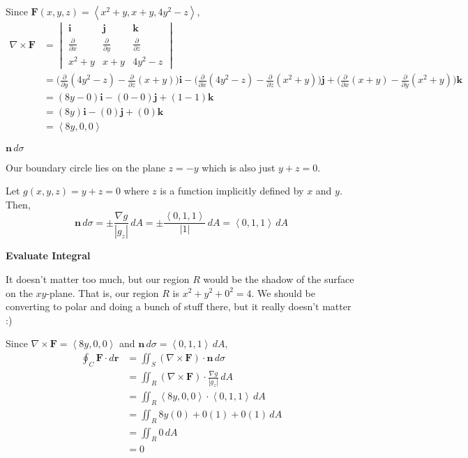 \documentclass{article}
\newcommand{\lrp}[1]{\left( #1 \right)}
\newcommand{\lra}[1]{\left\langle #1 \right\rangle}
\renewcommand{\i}[0]{\mathbf{{i}}}
\renewcommand{\j}[0]{\mathbf{{j}}}
\renewcommand{\k}[0]{\mathbf{{k}}}
\renewcommand{\r}[0]{\mathbf{r}}
\newcommand{\F}[0]{\mathbf{F}}
\newcommand{\n}[0]{{\mathbf{n}}}
\begin{document}
Since $\F(x,y,z)=\lra{x^2+y,x+y,4y^2-z}$,
\begin{align*}
     \nabla \times \F &=\begin{vmatrix}
    \i & \j & \k \\
    \frac{\partial }{\partial x} &  \frac{\partial }{\partial y} &
     \frac{\partial }{\partial z}\\
     x^2+y& x+y & 4y^2-z
    \end{vmatrix}\\
    &=\Bigg(\frac{\partial }{\partial y}(4y^2-z)-\frac{\partial }{\partial z}(x+y)\Bigg)\i-\Bigg(\frac{\partial}{\partial x}(4y^2-z)-\frac{\partial}{\partial z}(x^2+y)\Bigg)\j+\Bigg(\frac{\partial}{\partial x}(x+y)-\frac{\partial}{\partial y}({x^2+y})\Bigg)\k\\
    &=\lrp{8y-0}\i-\lrp{0-0}\j+\lrp{1-1}\k\\
    &=\lrp{8y}\i-\lrp{0}\j+\lrp{0}\k\\
    &=\lra{8y,0,0}
\end{align*}

{} \textbf{$\n\,d\sigma$}

Our boundary circle lies on the plane $z=-y$ which is also just $y+z=0$.

Let $g(x,y,z)=y+z=0$ where $z$ is a function implicitly defined by $x$ and $y$. Then,
\begin{equation*}
    \n\,d\sigma =\pm\frac{\nabla g}{\left|g_z\right|}\,dA=\pm \frac{\lra{0,1,1}}{\left|1\right|}\,dA=\lra{0,1,1}\,dA\tag{we want to be pointing outwards, away from origin}
\end{equation*}
{}\textbf{Evaluate Integral}

It doesn't matter too much, but our region $R$ would be the shadow of the surface on the $xy$-plane. That is, our region $R$ is $x^2+y^2+0^2=4$. We should be converting to polar and doing a bunch of stuff there, but it really doesn't matter :)

Since $\nabla \times \F =\lra{8y,0,0}$ and $\n\,d\sigma = \lra{0,1,1}\,dA$,
\begin{align*}
      \oint_C \F\cdot d\r&=\iint_S \lrp{\nabla \times \F}\cdot \n \,d\sigma\\
      &=\iint_R \lrp{\nabla \times \F}\cdot \frac{\nabla g}{\left|g_z\right|}\,dA\\
      &=\iint_R \lra{8y,0,0}\cdot \lra{0,1,1}\,dA\\
      &=\iint_R 8y(0)+0(1)+0(1)\,dA\\
      &=\iint_R 0\,dA\\
      &=\boxed{0}\tag{integral of $0$ is $0$}
\end{align*}
\end{document}
